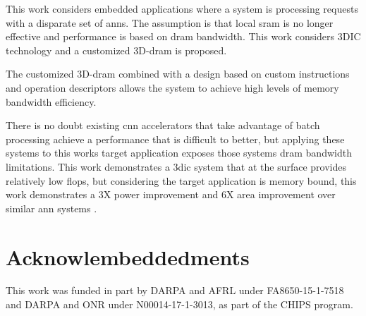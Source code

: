 \documentclass[journal]{IEEEtran}
\begin{document}
This work considers embedded applications where a system is processing requests with a disparate set of \acp{ann}. The assumption is that local \ac{sram} is no longer effective and performance is based on \ac{dram} bandwidth.
This work considers 3DIC technology and a customized 3D-\ac{dram} is proposed. 

The customized 3D-\ac{dram} combined with a design based on custom instructions and operation descriptors allows the system to achieve high levels of memory bandwidth efficiency.

There is no doubt existing \ac{cnn} accelerators that take advantage of batch processing achieve a performance that is difficult to better, but applying these systems to this works target application exposes those systems \ac{dram} bandwidth limitations.
This work demonstrates a \ac{3dic} system that at the surface provides relatively low \ac{flops}, but considering the target application is memory bound, this work demonstrates a 3X power improvement and 6X area improvement over similar \ac{ann} systems \cite{chen2016diannao,azarkhish2017neurostream,kim2016neurocube,gao2017tetris}.

\section{Acknowlembeddedments}
\label{sec:Acknowlembeddedments}
This work was funded in part by DARPA and AFRL under FA8650-15-1-7518 and DARPA and ONR under N00014-17-1-3013, as part of the CHIPS program.

\iffalse
\end{document}
